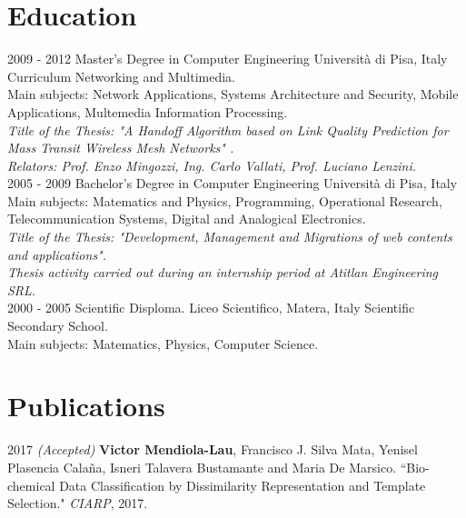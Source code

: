 \documentclass[]{friggeri-cv}
\begin{document}
\section{Education}
\begin{entrylist}
  \entry
    {2009 - 2012}
    {Master's Degree in Computer Engineering}
    {Università di Pisa, Italy}
    {Curriculum Networking and Multimedia.\\
    Main subjects: Network Applications, Systems Architecture and Security, Mobile Applications, Multemedia Information            Processing.\\
    \emph{Title of the Thesis: "A Handoff Algorithm based on Link Quality Prediction for Mass Transit Wireless Mesh Networks"      .}\\
    \emph{Relators: Prof. Enzo Mingozzi, Ing. Carlo Vallati, Prof. Luciano Lenzini.}\\}
  \entry
    {2005 - 2009}
    {Bachelor's Degree in Computer Engineering}
    {Università di Pisa, Italy}
    {Main subjects: Matematics and Physics, Programming, Operational Research, Telecommunication Systems, Digital and Analogical Electronics.\\
    \emph{Title of the Thesis: "Development, Management and Migrations of web contents and applications".}\\
    \emph{Thesis activity carried out during an internship period at Atitlan Engineering SRL.}\\}
  \entry
    {2000 - 2005}
    {Scientific Disploma.}
    {Liceo Scientifico, Matera, Italy}
    {Scientific Secondary School.\\
    Main subjects: Matematics, Physics, Computer Science.}
\end{entrylist}


\section{Publications}
\begin{paperlist}
  \paperentry
    {2017}
    {}
    {}
    {
		\emph{(Accepted)} \textbf{Victor Mendiola-Lau}, Francisco J. Silva Mata, Yenisel Plasencia Calaña, Isneri Talavera Bustamante and Maria De Marsico. ``Bio-chemical Data Classification by Dissimilarity Representation and Template Selection." \emph{CIARP}, 2017.
    }
\end{paperlist}
\end{document}
